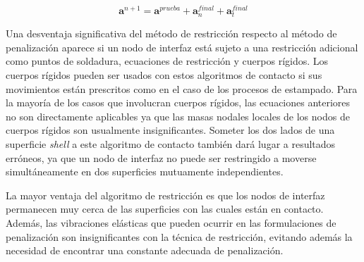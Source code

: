 $$
\mathbf{a}^{n+1} = \mathbf{a}^{prueba}  +  \mathbf{a}_n^{final} + \mathbf{a}_t^{final}
$$

Una desventaja significativa del método de restricción respecto al método de penalización 
aparece si un nodo de interfaz está sujeto a una restricción adicional como puntos de 
soldadura, ecuaciones de restricción y cuerpos rígidos. Los cuerpos rígidos pueden 
ser usados con estos algoritmos de contacto si sus movimientos están prescritos como 
en el caso de los procesos de estampado. Para la mayoría de los casos que involucran 
cuerpos rígidos, las ecuaciones anteriores no son directamente aplicables ya que las 
masas nodales locales de los nodos de cuerpos rígidos son usualmente insignificantes. 
Someter los dos lados de una superficie \textit{shell} a este algoritmo de contacto 
también dará lugar a resultados erróneos, ya que un nodo de interfaz no puede 
ser restringido a moverse simultáneamente en dos superficies mutuamente independientes.

La mayor ventaja del algoritmo de restricción es que los nodos de interfaz permanecen 
muy cerca de las superficies con las cuales están en contacto. Además, las vibraciones 
elásticas que pueden ocurrir en las formulaciones de penalización son insignificantes 
con la técnica de restricción, evitando además la necesidad de encontrar una constante 
adecuada de penalización.


